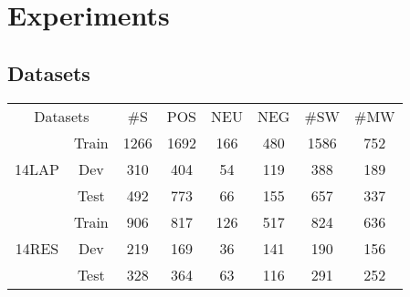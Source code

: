 \documentclass[11pt]{article}
\begin{document}
\section{Experiments}

\subsection{Datasets}
\begin{table}[t]
	\scriptsize
	\centering
	\begin{tabular}{cc|cccccc}
		\hline
		\multicolumn{2}{c|}{\multirow{2}{*}{Datasets}}      & \multirow{2}{*}{\#S} & \multirow{2}{*}{POS} & \multirow{2}{*}{NEU} & \multirow{2}{*}{NEG} & \multirow{2}{*}{\#SW} & \multirow{2}{*}{\#MW} \\
		\multicolumn{2}{c|}{}                               &                           &                           &                          &                           &                              &                            \\ \hline
		\multicolumn{1}{c|}{\multirow{3}{*}{14LAP}} & Train & 1266                      & 1692                      & 166                      & 480                       & 1586                         & 752                        \\
		\multicolumn{1}{c|}{}                       & Dev   & 310                       & 404                       & 54                       & 119                       & 388                          & 189                        \\
		\multicolumn{1}{c|}{}                       & Test  & 492                       & 773                       & 66                       & 155                       & 657                          & 337                        \\ \hline
		\multicolumn{1}{c|}{\multirow{3}{*}{14RES}} & Train & 906                       & 817                       & 126                      & 517                       & 824                          & 636                        \\
		\multicolumn{1}{c|}{}                       & Dev   & 219                       & 169                       & 36                       & 141                       & 190                          & 156                        \\
		\multicolumn{1}{c|}{}                       & Test  & 328                       & 364                       & 63                       & 116                       & 291                          & 252                        \\ \hline

\end{tabular}
\end{table}
\end{document}
